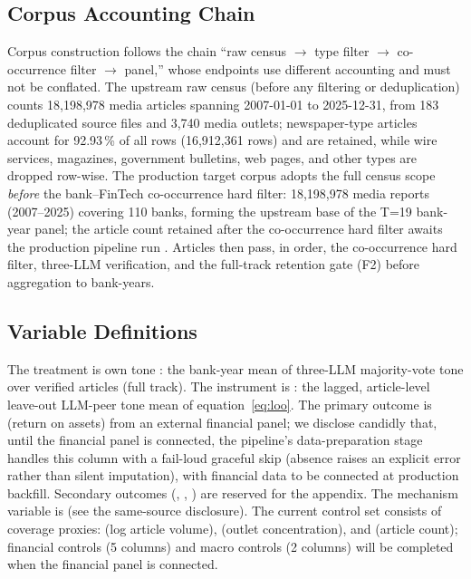 \subsection{Corpus Accounting Chain}
Corpus construction follows the chain ``raw census $\rightarrow$ type filter $\rightarrow$
co-occurrence filter $\rightarrow$ panel,'' whose endpoints use different accounting and must
not be conflated. The upstream raw census (before any filtering or deduplication) counts
18{,}198{,}978 media articles spanning 2007-01-01 to 2025-12-31, from 183 deduplicated source
files and 3{,}740 media outlets; newspaper-type articles account for 92.93\,\% of all rows
(16{,}912{,}361 rows) and are retained, while wire services, magazines, government bulletins,
web pages, and other types are dropped row-wise. The production target corpus adopts the
full census scope \emph{before} the bank--FinTech co-occurrence hard filter:
18{,}198{,}978 media reports (2007--2025) covering 110 banks, forming the
upstream base of the T=19 bank-year panel; the article count retained after the
co-occurrence hard filter awaits the production pipeline run . Articles then pass, in order, the
co-occurrence hard filter, three-LLM verification, and the full-track retention gate (F2)
before aggregation to bank-years.

\subsection{Variable Definitions}
The treatment is own tone : the bank-year mean of three-LLM
majority-vote tone over verified articles (full track). The instrument is
: the lagged, article-level leave-out LLM-peer tone mean of
equation~\eqref{eq:loo}. The primary outcome is  (return on assets) from an external
financial panel; we disclose candidly that, until the financial panel is connected, the
pipeline's data-preparation stage handles this column with a fail-loud graceful skip (absence
raises an explicit error rather than silent imputation), with financial data to be connected
at production backfill. Secondary outcomes (,
, ) are reserved for the appendix. The
mechanism variable is  (see the same-source disclosure). The
current control set consists of coverage proxies:  (log article
volume),  (outlet concentration), and  (article count);
financial controls (5 columns) and macro controls (2 columns) will be completed when the
financial panel is connected.

